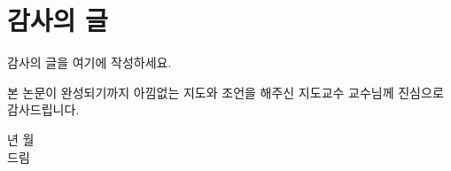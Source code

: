 \chapter*{감사의 글}
\thispagestyle{fancy}

감사의 글을 여기에 작성하세요.

본 논문이 완성되기까지 아낌없는 지도와 조언을 해주신 지도교수 \advisorname 교수님께 진심으로 감사드립니다.

\vspace{20mm}

\begin{flushright}
  \submityear 년 \submitmonth 월\\[5pt]
  \authorname 드림
\end{flushright}

